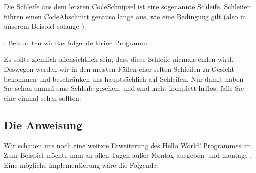\documentclass[letterpaper,10pt,english]{jupyterBook}
\begin{document}
\sphinxAtStartPar
Die Schleife aus dem letzten Code\sphinxhyphen{}Schnipsel ist eine sogenannte \sphinxhyphen{}Schleife. \sphinxhyphen{}Schleifen führen einen Code\sphinxhyphen{}Abschnitt genauso lange aus, wie eine Bedingung gilt (also in unserem Beispiel solange ).

\sphinxAtStartPar
{}. Betrachten wir das folgende kleine Programm:

\begin{sphinxVerbatim}[commandchars=\\\{\}]
 
       
          
\end{sphinxVerbatim}

\sphinxAtStartPar
Es sollte ziemlich offensichtlich sein, dass diese Schleife niemals enden wird. Deswegen werden wir in den meisten Fällen eher selten \sphinxhyphen{}Schleifen zu Gesicht bekommen und beschränken uns hauptsächlich auf \sphinxhyphen{}Schleifen. Nur damit haben Sie schon einmal eine \sphinxhyphen{}Schleife gesehen, und sind nicht komplett hilflos, falls Sie eine einmal sehen sollten.


\subsection{Die  \sphinxhyphen{} Anweisung}
\label{\detokenize{Notebooks/HelloWorld:die-if-else-anweisung}}
\sphinxAtStartPar
Wir schauen uns noch eine weitere Erweiterung des Hello World! \sphinxhyphen{} Programmes an. Zum Beispiel möchte man an allen Tagen außer Montag  ausgeben, und montags . Eine mögliche Implementierung wäre die Folgende:
\end{document}
